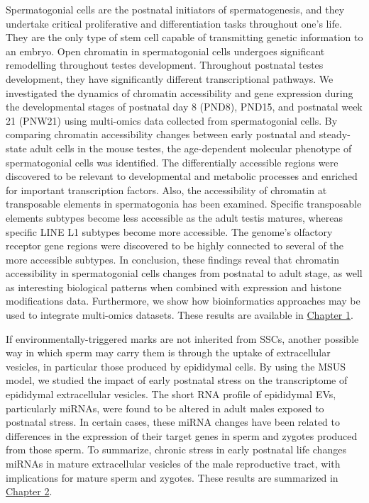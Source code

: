 \documentclass[12pt,twoside]{reedthesis}
\begin{document}
Spermatogonial cells are the postnatal initiators of spermatogenesis, and they undertake critical proliferative and differentiation tasks throughout one's life. They are the only type of stem cell capable of transmitting genetic information to an embryo. Open chromatin in spermatogonial cells undergoes significant remodelling throughout testes development. Throughout postnatal testes development, they have significantly different transcriptional pathways. We investigated the dynamics of chromatin accessibility and gene expression during the developmental stages of postnatal day 8 (PND8), PND15, and postnatal week 21 (PNW21) using multi-omics data collected from spermatogonial cells. By comparing chromatin accessibility changes between early postnatal and steady-state adult cells in the mouse testes, the age-dependent molecular phenotype of spermatogonial cells was identified. The differentially accessible regions were discovered to be relevant to developmental and metabolic processes and enriched for important transcription factors. Also, the accessibility of chromatin at transposable elements in spermatogonia has been examined. Specific transposable elements subtypes become less accessible as the adult testis matures, whereas specific LINE L1 subtypes become more accessible. The genome's olfactory receptor gene regions were discovered to be highly connected to several of the more accessible subtypes. In conclusion, these findings reveal that chromatin accessibility in spermatogonial cells changes from postnatal to adult stage, as well as interesting biological patterns when combined with expression and histone modifications data. Furthermore, we show how bioinformatics approaches may be used to integrate multi-omics datasets. These results are available in \protect\hyperlink{chapter1}{Chapter 1}.

If environmentally-triggered marks are not inherited from SSCs, another possible way in which sperm may carry them is through the uptake of extracellular vesicles, in particular those produced by epididymal cells. By using the MSUS model, we studied the impact of early postnatal stress on the transcriptome of epididymal extracellular vesicles. The short RNA profile of epididymal EVs, particularly miRNAs, were found to be altered in adult males exposed to postnatal stress. In certain cases, these miRNA changes have been related to differences in the expression of their target genes in sperm and zygotes produced from those sperm. To summarize, chronic stress in early postnatal life changes miRNAs in mature extracellular vesicles of the male reproductive tract, with implications for mature sperm and zygotes. These results are summarized in \protect\hyperlink{chapter2}{Chapter 2}.
\end{document}
